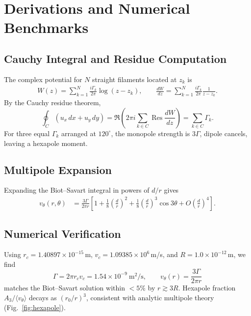 \documentclass[10pt,reprint,aps,onecolumn,nofootinbib]{revtex4-2}
\begin{document}
    \section{Derivations and Numerical Benchmarks}
    \label{app:three-swirl-derivations}

    \subsection{Cauchy Integral and Residue Computation}
        The complex potential for $N$ straight filaments located at $z_k$ is
        \begin{align}
            W(z)=\sum_{k=1}^{N}\frac{i\Gamma_k}{2\pi}\log(z-z_k),
            \qquad
            \frac{dW}{dz}=\sum_{k=1}^{N}\frac{i\Gamma_k}{2\pi}\frac{1}{z-z_k}.
        \end{align}
        By the Cauchy residue theorem,
        \[
            \oint_{C} (u_x\,dx+u_y\,dy)
            =\Re\!\left(2\pi i\sum_{k\in C}\operatorname{Res}\frac{dW}{dz}\right)
            =\sum_{k\in C}\Gamma_k.
        \]
        For three equal $\Gamma_k$ arranged at $120^\circ$, the monopole strength is $3\Gamma$,
        dipole cancels, leaving a hexapole moment.

    \subsection{Multipole Expansion}
        Expanding the Biot--Savart integral in powers of $d/r$ gives
        \begin{align}
            v_\theta(r,\theta)
            &=\frac{3\Gamma}{2\pi r}\left[1+\frac{1}{8}\!\left(\frac{d}{r}\right)^2
            +\frac{1}{8}\!\left(\frac{d}{r}\right)^3\cos3\theta+O\!\left(\frac{d}{r}\right)^4\right].
        \end{align}

    \subsection{Numerical Verification}
        Using $r_c=1.40897\times10^{-15}\,$m, $v_c=1.09385\times10^{6}\,$m/s, and
        $R=1.0\times10^{-12}\,$m, we find
        \[
            \Gamma=2\pi r_c v_c=1.54\times 10^{-9}\ \mathrm{m^2/s},\qquad
            v_\theta(r)=\frac{3\Gamma}{2\pi r}
        \]
        matches the Biot--Savart solution within $<5\%$ by $r\gtrsim 3R$. Hexapole fraction
        $A_3/\langle v_\theta\rangle$ decays as $(r_0/r)^3$, consistent with analytic
        multipole theory (Fig.~\ref{fig:hexapole}).
\end{document}
